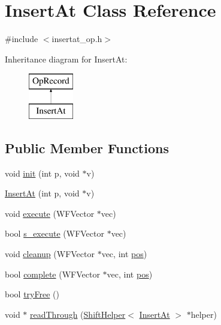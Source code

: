 \hypertarget{class_insert_at}{}\section{Insert\+At Class Reference}
\label{class_insert_at}


{\ttfamily \#include $<$insertat\+\_\+op.\+h$>$}

Inheritance diagram for Insert\+At\+:\begin{figure}[H]
\begin{center}
\leavevmode
\includegraphics[height=2.000000cm]{class_insert_at}
\end{center}
\end{figure}
\subsection*{Public Member Functions}
\begin{DoxyCompactItemize}
\item 
void \hyperlink{class_insert_at_a44d47d24a48f8bcedd833129dadedea0}{init} (int p, void $\ast$v)
\item 
\hyperlink{class_insert_at_aa86ff4bb5674c3be14a46a29dacd3d9f}{Insert\+At} (int p, void $\ast$v)
\item 
void \hyperlink{class_insert_at_a80960f22e24c552a92f02963b3f9032c}{execute} (W\+F\+Vector $\ast$vec)
\item 
bool \hyperlink{class_insert_at_aca674527cd17b29b486a3082ab0437a4}{s\+\_\+execute} (W\+F\+Vector $\ast$vec)
\item 
void \hyperlink{class_insert_at_af3728e08aaa557a8c99ba81564120597}{cleanup} (W\+F\+Vector $\ast$vec, int \hyperlink{class_insert_at_a926928e16ec2ab511860662a01f3082a}{pos})
\item 
bool \hyperlink{class_insert_at_a2d95031cbed8c06477dd5001588757ca}{complete} (W\+F\+Vector $\ast$vec, int \hyperlink{class_insert_at_a926928e16ec2ab511860662a01f3082a}{pos})
\item 
bool \hyperlink{class_insert_at_a09d79636c2ba9023e3600d80d0af314c}{try\+Free} ()
\item 
void $\ast$ \hyperlink{class_insert_at_a7ccae8ef989a96aece9e7aef1afbd553}{read\+Through} (\hyperlink{class_shift_helper}{Shift\+Helper}$<$ \hyperlink{class_insert_at}{Insert\+At} $>$ $\ast$helper)
\end{DoxyCompactItemize}
